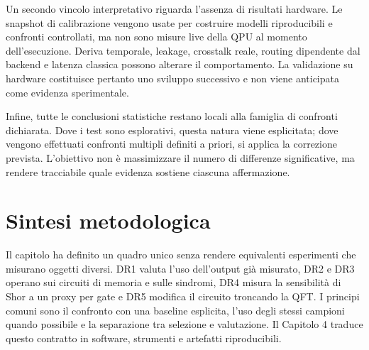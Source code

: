 Un secondo vincolo interpretativo riguarda l'assenza di risultati hardware. Le snapshot di calibrazione vengono usate per costruire modelli riproducibili e confronti controllati, ma non sono misure live della QPU al momento dell'esecuzione. Deriva temporale, leakage, crosstalk reale, routing dipendente dal backend e latenza classica possono alterare il comportamento. La validazione su hardware costituisce pertanto uno sviluppo successivo e non viene anticipata come evidenza sperimentale.

Infine, tutte le conclusioni statistiche restano locali alla famiglia di confronti dichiarata. Dove i test sono esplorativi, questa natura viene esplicitata; dove vengono effettuati confronti multipli definiti a priori, si applica la correzione prevista. L'obiettivo non è massimizzare il numero di differenze significative, ma rendere tracciabile quale evidenza sostiene ciascuna affermazione.

\section{Sintesi metodologica}\label{sec:finale_3_6}

Il capitolo ha definito un quadro unico senza rendere equivalenti esperimenti che misurano oggetti diversi. DR1 valuta l'uso dell'output già misurato, DR2 e DR3 operano sui circuiti di memoria e sulle sindromi, DR4 misura la sensibilità di Shor a un proxy per gate e DR5 modifica il circuito troncando la QFT. I principi comuni sono il confronto con una baseline esplicita, l'uso degli stessi campioni quando possibile e la separazione tra selezione e valutazione. Il Capitolo 4 traduce questo contratto in software, strumenti e artefatti riproducibili.
